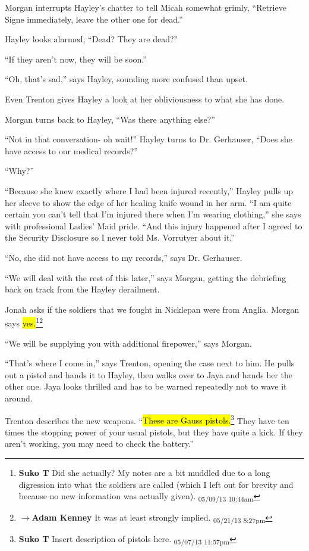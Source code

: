 Morgan interrupts Hayley's chatter to tell Micah somewhat grimly, ``Retrieve Signe immediately, leave the other one for dead.''

Hayley looks alarmed, ``Dead?  They are dead?''

``If they aren't now, they will be soon.''

``Oh, that's sad,'' says Hayley, sounding more confused than upset.

Even Trenton gives Hayley a look at her obliviousness to what she has done.

Morgan turns back to Hayley, ``Was there anything else?''

``Not in that conversation- oh wait!''  Hayley turns to Dr. Gerhauser, ``Does she have access to our medical records?''

``Why?''

``Because she knew exactly where I had been injured recently,'' Hayley pulls up her sleeve to show the edge of her healing knife wound in her arm. ``I am quite certain you can't tell that I'm injured there when I'm wearing clothing,'' she says with professional Ladies' Maid pride.  ``And this injury happened after I agreed to the Security Disclosure so I never told Ms. Vorrutyer about it.''

``No, she did not have access to my records,'' says Dr. Gerhauser.



``We will deal with the rest of this later,'' says Morgan, getting the debriefing back on track from the Hayley derailment.  

Jonah asks if the soldiers that we fought in Nicklepan were from Anglia.  Morgan says \hl{yes.}\footnote{\textbf{Suko T }Did she actually?  My notes are a bit muddled due to a long digression into what the soldiers are called (which I left out for brevity and because no new information was actually given). \textsubscript{05/09/13 10:44am}}\footnote{$\rightarrow$\textbf{Adam Kenney }It was at least strongly implied. \textsubscript{05/21/13 8:27pm}}

``We will be supplying you with additional firepower,'' says Morgan.

``That's where I come in,'' says Trenton, opening the case next to him.  He pulls out a pistol and hands it to Hayley, then walks over to Jaya and hands her the other one.  Jaya looks thrilled and has to be warned repeatedly not to wave it around. 

Trenton describes the new weapons.  ``\hl{These are Gauss pistols.}\footnote{\textbf{Suko T }Insert description of pistols here. \textsubscript{05/07/13 11:57pm}}  They have ten times the stopping power of your usual pistols, but they have quite a kick.  If they aren't working, you may need to check the battery.''

